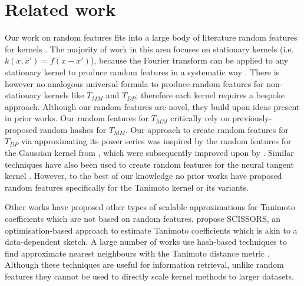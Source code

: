 \section{Related work}\label{sec:trf:related-work}


Our work on random features fits into a large body
of literature random features
for kernels \citep{liu2021random}.
The majority of work in this area
focuses on stationary kernels (i.e.\@ $k(x,x')=f(x-x')$),
because the Fourier transform can be applied
to any stationary kernel to produce random features
in a systematic way \citep{rahimi2007random}.
There is however no analogous universal formula to produce
random features for non-stationary kernels like $T_{MM}$ and $T_{DP}$;
therefore each kernel requires a bespoke approach.
Although our random features are novel, they build upon ideas present in prior works.
Our random features for $T_{MM}$ critically rely on previously-proposed random hashes for $T_{MM}$.
Our approach to create random features for $T_{DP}$ via approximating its power series was inspired
by the random features for the Gaussian kernel from \citet{cotter2011explicit},
which were subsequently improved upon by \citet{ahle2020oblivious}.
Similar techniques have also been used to create random features for the neural tangent kernel \citep{zandieh2021scaling}.
However, to the best of our knowledge no prior
works have proposed random features specifically for the Tanimoto
kernel or its variants.

Other works have proposed other types of scalable approximations for Tanimoto coefficients which are not based on random features.
\citet{haque2010scissors} propose SCISSORS, an optimisation-based approach to estimate Tanimoto coefficients which is akin to a data-dependent sketch.
A large number of works use hash-based techniques to find approximate nearest neighbours with the Tanimoto distance metric
\citep{nasr2010hashing,kristensen2011using,tabei2011sketchsort,anastasiu2017efficient}.
Although these techniques are useful for information retrieval,
unlike random features they cannot be used to directly scale kernel methods to larger datasets.
